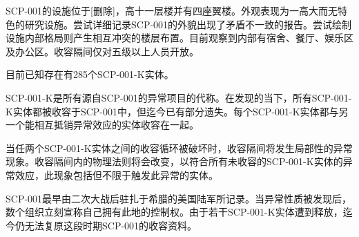 SCP-001的设施位于{[}删除]，高十一层楼并有四座翼楼。外观表现为一高大而无特色的研究设施。尝试详细记录SCP-001的外貌出现了矛盾不一致的报告。尝试绘制设施内部格局则产生相互冲突的楼层布置。目前观察到内部有宿舍、餐厅、娱乐区及办公区。收容隔间仅对五级以上人员开放。

目前已知存在有285个SCP-001-K实体。

SCP-001-K是所有源自SCP-001的异常项目的代称。在发现的当下，所有SCP-001-K实体都被收容于SCP-001中，但迄今已有部分遗失。每个SCP-001-K实体都与另一个能相互抵销异常效应的实体收容在一起。

当任两个SCP-001-K实体之间的收容循环被破坏时，收容隔间将发生局部性的异常现象。收容隔间内的物理法则将会改变，以符合所有未收容的SCP-001-K实体的异常效应，此现象包括但不限于触发此异常的实体。

SCP-001最早由二次大战后驻扎于希腊的美国陆军所记录。当异常性质被发现后，数个组织立刻宣称自己拥有此地的控制权。由于若干SCP-001-K实体遭到释放，迄今仍无法复原这段时期SCP-001的收容资料。

